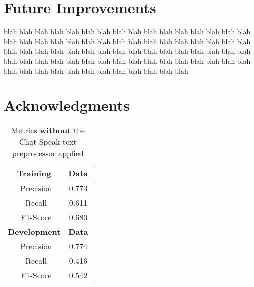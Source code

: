 \documentclass[11pt,letterpaper]{article}
\begin{document}


\section{Future Improvements}
blah blah blah blah blah blah blah blah blah blah blah blah blah blah blah blah blah blah blah 
blah blah blah blah blah blah blah blah blah blah blah blah blah blah blah blah blah blah blah 
blah blah blah blah blah blah blah blah blah blah blah blah blah blah blah blah blah blah blah 
blah blah blah blah blah blah blah blah blah blah blah blah blah blah blah blah blah blah blah 
\section*{Acknowledgments}



\begin{table}[htp]
\begin{center}
\begin{tabularx}{111pt}{|c|c|}
\hline
\bf Training & \bf Data \\ 
\hline
\ Precision & 0.773 \\
\ Recall & 0.611 \\
\ F1-Score & 0.680 \\
\hline
\bf Development & \bf Data \\ 
\hline
\ Precision & 0.774 \\
\ Recall & 0.416 \\
\ F1-Score & 0.542 \\
\hline
\end{tabularx}
\end{center}
\caption{\label{chatspeak-without-table} Metrics {\bf without} the Chat Speak text preprocessor applied }
\end{table}
\end{document}
